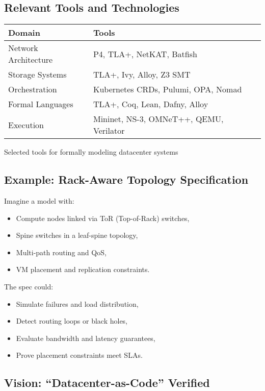 \subsection*{Relevant Tools and Technologies}

\begin{marginfigure}
\footnotesize
\begin{tabularx}{\linewidth}{@{}lX@{}}
\toprule
\textbf{Domain} & \textbf{Tools} \\
\midrule
Network Architecture & P4, TLA+, NetKAT, Batfish \\
Storage Systems & TLA+, Ivy, Alloy, Z3 SMT \\
Orchestration & Kubernetes CRDs, Pulumi, OPA, Nomad \\
Formal Languages & TLA+, Coq, Lean, Dafny, Alloy \\
Execution & Mininet, NS-3, OMNeT++, QEMU, Verilator \\
\bottomrule
\end{tabularx}
\caption{Selected tools for formally modeling datacenter systems}
\end{marginfigure}

\subsection*{Example: Rack-Aware Topology Specification}

Imagine a model with:
\begin{itemize}
  \item Compute nodes linked via ToR (Top-of-Rack) switches,
  \item Spine switches in a leaf-spine topology,
  \item Multi-path routing and QoS,
  \item VM placement and replication constraints.
\end{itemize}

The spec could:
\begin{itemize}
  \item Simulate failures and load distribution,
  \item Detect routing loops or black holes,
  \item Evaluate bandwidth and latency guarantees,
  \item Prove placement constraints meet SLAs.
\end{itemize}

\subsection*{Vision: ``Datacenter-as-Code'' Verified}

